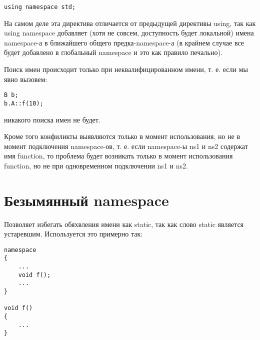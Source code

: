 \begin{lstlisting}
using namespace std;
\end{lstlisting}

На самом деле эта директива отличается от предыдущей директивы using, так как using namespace добавляет (хотя не совсем, доступность будет
локальной) имена namespace-а в ближайшего общего предка-namespace-а (в крайнем случае все будет добавлено в глобальный namespace и это как
правило печально).

Поиск имен происходит только при неквалифицированном имени, т. е. если мы явно вызовем:

\begin{lstlisting}
B b;
b.A::f(10);
\end{lstlisting}

никакого поиска имен не будет.

Кроме того конфиликты выявляются только в момент использования, но не в момент подключения namespace-ов, т. е. если namespace-ы ns1 и ns2
содержат имя function, то проблема будет возникать только в момент использования function, но не при одновременном подключении ns1 и ns2.

\section{Безымянный namespace}

Позволяет избегать обяхвления имени как static, так как слово static является устаревшим. Используется это примерно так:

\begin{lstlisting}
namespace
{
	...
	void f();
	...
}

void f()
{
	...
}
\end{lstlisting}

